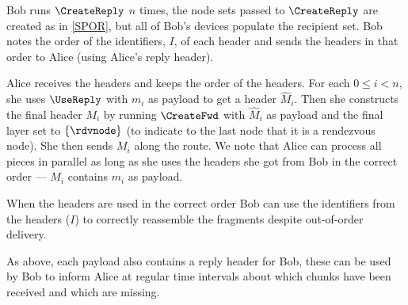 Bob runs \(\CreateReply\) \(n\) times, the node sets passed to \(\CreateReply\) 
are created as in \cref{SPOR}, but all of Bob's devices populate the recipient 
set.
Bob notes the order of the identifiers, \(I\), of each header and sends the 
headers in that order to Alice (using Alice's reply header).

Alice receives the headers and keeps the order of the headers.
For each \(0\leq i < n\), she uses \(\UseReply\) with \(m_i\) as payload to get 
a header \(\hat M_i\).
Then she constructs the final header \(M_i\) by running \(\CreateFwd\) with 
\(\hat M_i\) as payload and the final layer set to \(\{\rdvnode\}\) (to 
indicate to the last node that it is a rendezvous node).
She then sends \(M_i\) along the route.
We note that Alice can process all pieces in parallel as long as she uses the 
headers she got from Bob in the correct order --- \ie \(M_i\) contains \(m_i\) 
as payload.

When the headers are used in the correct order Bob can use the identifiers from 
the headers (\(I\)) to correctly reassemble the fragments despite out-of-order 
delivery.

As above, each payload also contains a reply header for Bob, these can be used 
by Bob to inform Alice at regular time intervals about which chunks have been 
received and which are missing.

